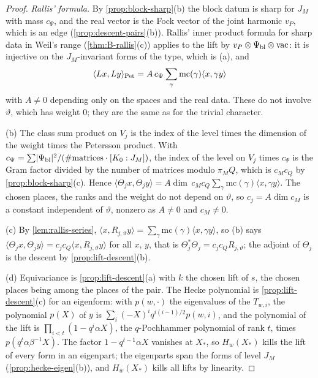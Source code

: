 \begin{proof}
\emph{Rallis' formula.} By \cref{prop:block-sharp}(b) the block datum is sharp for $J_M$ with mass $c_\Psi$, and the real vector is the Fock vector of the joint harmonic $v_P$, which is an edge (\cref{prop:descent-pairs}(b)). Rallis' inner product formula for sharp data in
Weil's range (\cref{thm:B-rallis}(c)) applies to the lift by $v_P\otimes\Psi_{\rm bl}\otimes\mathrm{vac}$: it is injective on the $J_M$-invariant forms of the type, which is (a), and
\[
  \langle Lx,Ly\rangle_{\rm Pet}=A\,c_\Psi\sum_\gamma\mathrm{mc}(\gamma)\langle x,\gamma y\rangle
\]
with $A\ne0$ depending only on the spaces and the real data. These do not involve $\vartheta$, which has weight $0$; they are the same as for the trivial character.

(b) The class sum product on $V_j$ is the index of the level times the dimension of the weight times the Petersson product. With $c_\Psi=\sum\lvert \Psi_{\rm bl}\rvert^2/(\#\text{matrices}\cdot[K_0:J_M])$, the index of the level on $V_j$ times $c_\Psi$ is the Gram
factor divided by the number of matrices modulo $\pi_MQ$, which is $c_Mc_Q$ by \cref{prop:block-sharp}(c). Hence $\langle\Theta_jx,\Theta_jy\rangle=A\dim\,c_Mc_Q\sum_\gamma\mathrm{mc}(\gamma)\langle x,\gamma y\rangle$. The chosen places, the ranks and the weight do not depend
on $\vartheta$, so $c_j=A\dim c_M$ is a constant independent of $\vartheta$, nonzero as $A\ne0$ and $c_M\ne0$.

(c) By \cref{lem:rallis-series}, $\langle x,R_{j,\vartheta}y\rangle=\sum_\gamma\mathrm{mc}(\gamma)\langle x,\gamma y\rangle$, so (b) says $\langle\Theta_jx,\Theta_jy\rangle=c_jc_Q\langle x,R_{j,\vartheta}y\rangle$ for all $x$, $y$, that is $\Theta_j^*\Theta_j=c_jc_QR_{j,\vartheta}$; the adjoint of $\Theta_j$ is the
descent by \cref{prop:lift-descent}(b).

(d) Equivariance is \cref{prop:lift-descent}(a) with $k$ the chosen lift of $s$, the chosen places being among the places of the pair. The Hecke polynomial is \cref{prop:lift-descent}(c) for an eigenform: with $p(w,\cdot)$ the eigenvalues of
the $T_{w,i}$, the polynomial $p(X)$ of $y$ is $\sum_i(-X)^iq^{i(i-1)/2}p(w,i)$, and the polynomial of the lift is $\prod_{i<t}(1-q^i\alpha X)$, the $q$-Pochhammer polynomial of rank $t$, times $p(q^t\alpha\beta^{-1}X)$. The factor $1-q^{t-1}\alpha X$ vanishes at
$X_*$, so $H_w(X_*)$ kills the lift of every form in an eigenpart; the eigenparts span the forms of level $J_M$ (\cref{prop:hecke-eigen}(b)), and $H_w(X_*)$ kills all lifts by linearity.
\end{proof}

